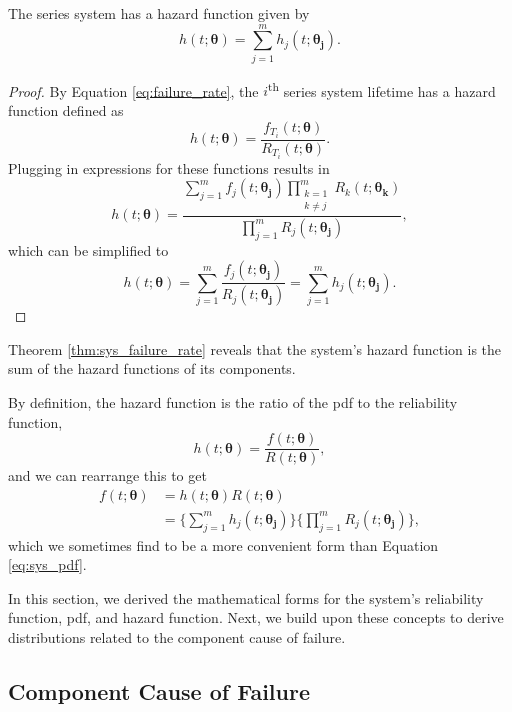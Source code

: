 \documentclass[
]{article}
\begin{document}
\begin{theorem}
\label{thm:sys_failure_rate}
The series system has a hazard function given by
\begin{equation}
\label{eq:sys_failure_rate}
  h(t;\boldsymbol{\theta}) = \sum_{j=1}^m h_j(t;\boldsymbol{\theta_j}).
\end{equation}
\end{theorem}
\begin{proof}
By Equation \eqref{eq:failure_rate}, the $i$\textsuperscript{th} series system lifetime has a hazard function defined as
$$
  h(t;\boldsymbol{\theta}) = \frac{f_{T_i}(t;\boldsymbol{\theta})}{R_{T_i}(t;\boldsymbol{\theta})}.
$$
Plugging in expressions for these functions results in
$$
  h(t;\boldsymbol{\theta}) = \frac{\sum_{j=1}^m f_j(t;\boldsymbol{\theta_j})
    \prod_{\substack{k=1\\k \neq j}}^m R_k(t;\boldsymbol{\theta_k})}
      {\prod_{j=1}^m R_j(t;\boldsymbol{\theta_j})},
$$
which can be simplified to
$$
h(t;\boldsymbol{\theta}) = \sum_{j=1}^m \frac{f_j(t;\boldsymbol{\theta_j})}{R_j(t;\boldsymbol{\theta_j})} = \sum_{j=1}^m h_j(t;\boldsymbol{\theta_j}).
$$
\end{proof}

Theorem \ref{thm:sys_failure_rate} reveals that the system's hazard
function is the sum of the hazard functions of its components.

By definition, the hazard function is the ratio of the pdf to the
reliability function, \[
h(t;\boldsymbol{\theta}) = \frac{f(t;\boldsymbol{\theta})}{R(t;\boldsymbol{\theta})},
\] and we can rearrange this to get \begin{equation}
\label{eq:sys_pdf_2}
\begin{split}
f(t;\boldsymbol{\theta}) &= h(t;\boldsymbol{\theta}) R(t;\boldsymbol{\theta})\\
              &= \biggl\{\sum_{j=1}^m h_j(t;\boldsymbol{\theta_j})\biggr\}
                 \biggl\{ \prod_{j=1}^m R_j(t;\boldsymbol{\theta_j}) \biggr\},
\end{split}
\end{equation} which we sometimes find to be a more convenient form than
Equation \eqref{eq:sys_pdf}.

In this section, we derived the mathematical forms for the system's
reliability function, pdf, and hazard function. Next, we build upon
these concepts to derive distributions related to the component cause of
failure.

\hypertarget{sec:comp_cause}{%
\subsection{Component Cause of Failure}\label{sec:comp_cause}}
\end{document}
